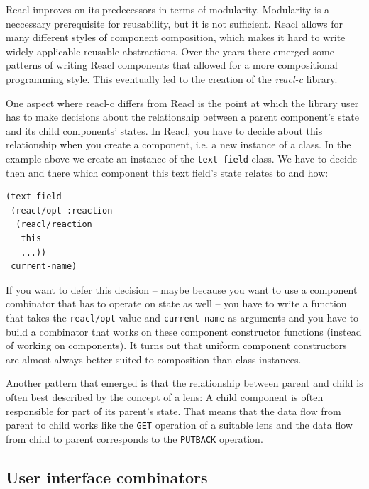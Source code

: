 \documentclass[sigplan,screen]{acmart}
\begin{document}
Reacl improves on its predecessors in terms of modularity. Modularity
is a neccessary prerequisite for reusability, but it is not
sufficient. Reacl allows for many different styles of component
composition, which makes it hard to write widely applicable reusable
abstractions. Over the years there emerged some patterns of writing
Reacl components that allowed for a more compositional programming
style. This eventually led to the creation of the \textit{reacl-c}
library.

One aspect where reacl-c differs from Reacl is the point at which the
library user has to make decisions about the relationship between a
parent component's state and its child components' states. In Reacl,
you have to decide about this relationship when you create a
component, i.e. a new instance of a class. In the example above we
create an instance of the \texttt{text-field} class. We have to decide
then and there which component this text field's state relates to and
how:
%
\begin{verbatim}
(text-field
 (reacl/opt :reaction
  (reacl/reaction
   this
   ...))
 current-name)
\end{verbatim}
%
If you want to defer this decision -- maybe because you want to use a
component combinator that has to operate on state as well -- you have
to write a function that takes the \texttt{reacl/opt} value and
\texttt{current-name} as arguments and you have to build a combinator
that works on these component constructor functions (instead of
working on components). It turns out that uniform component
constructors are almost always better suited to composition than class
instances.

Another pattern that emerged is that the relationship between parent
and child is often best described by the concept of a lens\cite{lens}:
A child component is often responsible for part of its parent's
state. That means that the data flow from parent to child works like
the \texttt{GET} operation of a suitable lens and the data flow from
child to parent corresponds to the \texttt{PUTBACK} operation.

\subsection{User interface combinators}
\end{document}
